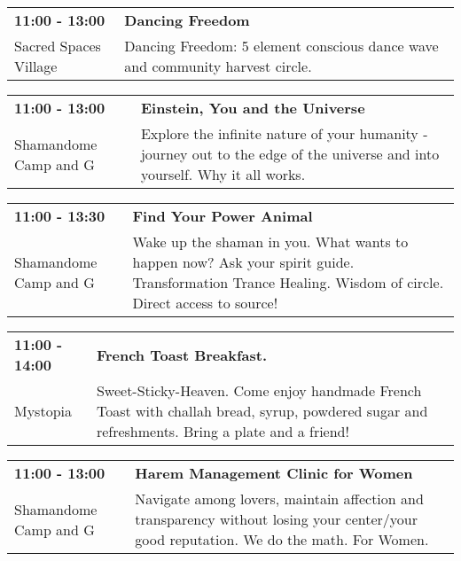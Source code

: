 \begin{tabular}{ p{1in} p{2.2in} }
    \textbf{11:00 - 13:00} & \textbf{Dancing Freedom} \\
    Sacred Spaces Village \newline  & Dancing Freedom: 5 element conscious dance wave and community harvest circle. \\
    \hline 
\end{tabular}
    
\begin{tabular}{ p{1in} p{2.2in} }
    \textbf{11:00 - 13:00} & \textbf{Einstein, You and the Universe} \\
    Shamandome Camp \newline 615 and G & Explore the infinite nature of your humanity - journey out to the edge of the universe and into yourself. Why it all works. \\
    \hline 
\end{tabular}
    
\begin{tabular}{ p{1in} p{2.2in} }
    \textbf{11:00 - 13:30} & \textbf{Find Your Power Animal} \\
    Shamandome Camp \newline 615 and G & Wake up the shaman in you. What wants to happen now? Ask your spirit guide. Transformation Trance Healing. Wisdom of circle. Direct access to source! \\
    \hline 
\end{tabular}
    
\begin{tabular}{ p{1in} p{2.2in} }
    \textbf{11:00 - 14:00} & \textbf{French Toast Breakfast.} \\
    Mystopia \newline  & Sweet-Sticky-Heaven. Come enjoy handmade French Toast with challah bread, syrup, powdered sugar and refreshments. Bring a plate and a friend! \\
    \hline 
\end{tabular}
    
\begin{tabular}{ p{1in} p{2.2in} }
    \textbf{11:00 - 13:00} & \textbf{Harem Management Clinic for Women} \\
    Shamandome Camp \newline 615 and G & Navigate among lovers, maintain affection and transparency without losing your center/your good reputation. We do the math. For Women. \\
    \hline 
\end{tabular}
    
